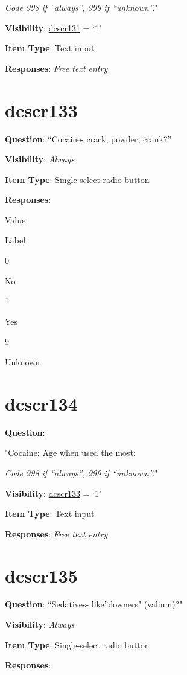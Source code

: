 \documentclass[]{book}
\begin{document}
\emph{Code 998 if ``always'', 999 if ``unknown''.}"

\textbf{Visibility}: \protect\hyperlink{dcscr131}{dcscr131} = `1'

\textbf{Item Type}: Text input

\textbf{Responses}: \emph{Free text entry}

\hypertarget{dcscr133}{%
\section{dcscr133}\label{dcscr133}}

\textbf{Question}: ``Cocaine- crack, powder, crank?''

\textbf{Visibility}: \emph{Always}

\textbf{Item Type}: Single-select radio button

\textbf{Responses}:

Value

Label

0

No

1

Yes

9

Unknown

\hypertarget{dcscr134}{%
\section{dcscr134}\label{dcscr134}}

\textbf{Question}:

"Cocaine: Age when used the most:

\emph{Code 998 if ``always'', 999 if ``unknown''.}"

\textbf{Visibility}: \protect\hyperlink{dcscr133}{dcscr133} = `1'

\textbf{Item Type}: Text input

\textbf{Responses}: \emph{Free text entry}

\hypertarget{dcscr135}{%
\section{dcscr135}\label{dcscr135}}

\textbf{Question}: ``Sedatives- like''downers" (valium)?"

\textbf{Visibility}: \emph{Always}

\textbf{Item Type}: Single-select radio button

\textbf{Responses}:
\end{document}

